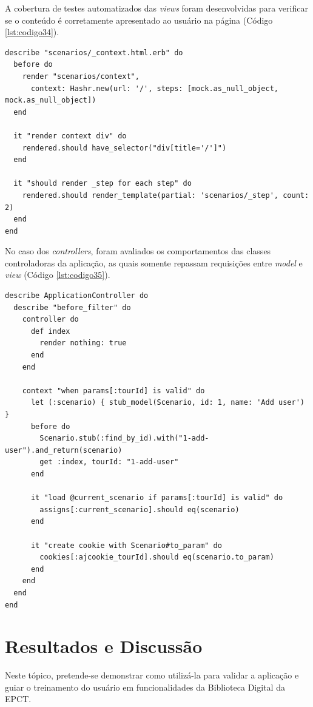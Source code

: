 A cobertura de testes automatizados das \textit{views} foram desenvolvidas para verificar se o conteúdo é corretamente apresentado ao usuário na página (Código \ref{lst:codigo34}).

{\singlespace
\begin{lstlisting}[caption=Teste unitário de \textit{view},label={lst:codigo34}]
describe "scenarios/_context.html.erb" do
  before do
    render "scenarios/context",
      context: Hashr.new(url: '/', steps: [mock.as_null_object, mock.as_null_object])
  end

  it "render context div" do
    rendered.should have_selector("div[title='/']")
  end

  it "should render _step for each step" do
    rendered.should render_template(partial: 'scenarios/_step', count: 2)
  end
end
\end{lstlisting}
}

No caso dos \textit{controllers}, foram avaliados os comportamentos das classes controladoras da aplicação, as quais somente repassam requisições entre \textit{model} e \textit{view} (Código \ref{lst:codigo35}).

{\singlespace
\begin{lstlisting}[caption=Teste unitário de \textit{controller},label={lst:codigo35}]
describe ApplicationController do
  describe "before_filter" do
    controller do
      def index
        render nothing: true
      end
    end

    context "when params[:tourId] is valid" do
      let (:scenario) { stub_model(Scenario, id: 1, name: 'Add user') }
      before do
        Scenario.stub(:find_by_id).with("1-add-user").and_return(scenario)
        get :index, tourId: "1-add-user"
      end

      it "load @current_scenario if params[:tourId] is valid" do
        assigns[:current_scenario].should eq(scenario)
      end

      it "create cookie with Scenario#to_param" do
        cookies[:ajcookie_tourId].should eq(scenario.to_param)
      end
    end
  end
end
\end{lstlisting}
}

\section{Resultados e Discussão}

Neste tópico, pretende-se demonstrar como utilizá-la para validar a aplicação e guiar o treinamento do usuário em funcionalidades da Biblioteca Digital da EPCT.

